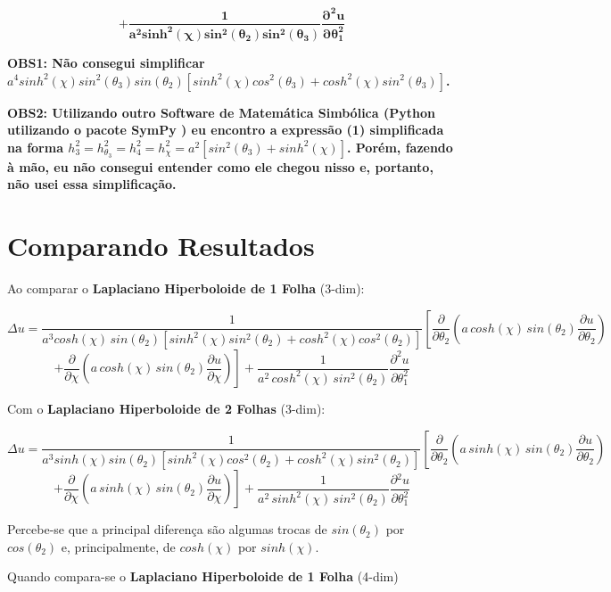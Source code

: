\documentclass[12pt, a4papper]{article}
\begin{document}
\[
\boldsymbol{+\frac{1}{a^{2}sinh^{2}(\chi)sin^{2}(\theta_{2})sin^{2}(\theta_{3})}\frac{\partial^{2}u}{\partial\theta_{1}^{2}}}
\]

\textbf{OBS1: Não consegui simplificar $a^{4}sinh^{2}(\chi)sin^{2}(\theta_{3})sin(\theta_{2})\left[sinh^{2}(\chi)cos^{2}(\theta_{3})+cosh^{2}(\chi)sin^{2}(\theta_{3})\right]$.}

\textbf{OBS2: Utilizando outro Software de Matemática Simbólica (Python
utilizando o pacote SymPy ) eu encontro a expressão (1) simplificada
na forma $h_{3}^{2}=h_{\theta_{3}}^{2}=h_{4}^{2}=h_{\chi}^{2}=a^{2}\left[sin^{2}(\theta_{3})+sinh^{2}(\chi)\right]$.
Porém, fazendo à mão, eu não consegui entender como ele chegou nisso
e, portanto, não usei essa simplificação.}

\section{Comparando Resultados}

Ao comparar o \textbf{Laplaciano Hiperboloide de 1 Folha} (3-dim):

\[
\Delta u=\frac{1}{a^{3}cosh(\chi)\,sin(\theta_{2})\left[sinh^{2}(\chi)sin^{2}(\theta_{2})+cosh^{2}(\chi)cos^{2}(\theta_{2})\right]}\left[\frac{\partial}{\partial\theta_{2}}\left(a\,cosh(\chi)\,sin(\theta_{2})\frac{\partial u}{\partial\theta_{2}}\right) \right.
\]
\[ \left. +\frac{\partial}{\partial\chi}\left(a\,cosh(\chi)\,sin(\theta_{2})\frac{\partial u}{\partial\chi}\right)\right]+\frac{1}{a^{2}\,cosh^{2}(\chi)\,sin^{2}(\theta_{2})}\frac{\partial^{2}u}{\partial\theta_{1}^{2}}\]


Com o \textbf{Laplaciano Hiperboloide de 2 Folhas} (3-dim):

\[
\Delta u=\frac{1}{a^{3}sinh(\chi)sin(\theta_{2})\left[sinh^{2}(\chi)cos^{2}(\theta_{2})+cosh^{2}(\chi)sin^{2}(\theta_{2})\right]}\left[\frac{\partial}{\partial\theta_{2}}\left(a\,sinh(\chi)\,sin(\theta_{2})\frac{\partial u}{\partial\theta_{2}}\right) \right.
\]
\[ \left. +\frac{\partial}{\partial\chi}\left(a\,sinh(\chi)\,sin(\theta_{2})\frac{\partial u}{\partial\chi}\right)\right] +\frac{1}{a^{2}\,sinh^{2}(\chi)\,sin^{2}(\theta_{2})}\frac{\partial{{}^2}u}{\partial\theta_{1}^{2}} \]


Percebe-se que a principal diferença são algumas trocas de $sin(\theta_{2})$
por $cos(\theta_{2})$ e, principalmente, de $cosh(\chi)$ por $sinh(\chi)$.

Quando compara-se o \textbf{Laplaciano Hiperboloide de 1 Folha} (4-dim) 
\end{document}
